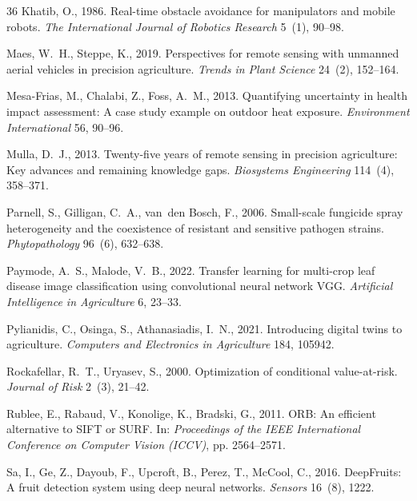 \documentclass[review,3p,times,authoryear]{elsarticle}
\begin{document}
\begin{thebibliography}{36}
Khatib, O., 1986.
\newblock Real-time obstacle avoidance for manipulators and mobile robots.
\newblock \emph{The International Journal of Robotics Research} 5~(1), 90--98.

Maes, W.~H., Steppe, K., 2019.
\newblock Perspectives for remote sensing with unmanned aerial vehicles in precision agriculture.
\newblock \emph{Trends in Plant Science} 24~(2), 152--164.

Mesa-Frias, M., Chalabi, Z., Foss, A.~M., 2013.
\newblock Quantifying uncertainty in health impact assessment: A case study example on outdoor heat exposure.
\newblock \emph{Environment International} 56, 90--96.

Mulla, D.~J., 2013.
\newblock Twenty-five years of remote sensing in precision agriculture: Key advances and remaining knowledge gaps.
\newblock \emph{Biosystems Engineering} 114~(4), 358--371.

Parnell, S., Gilligan, C.~A., van~den Bosch, F., 2006.
\newblock Small-scale fungicide spray heterogeneity and the coexistence of resistant and sensitive pathogen strains.
\newblock \emph{Phytopathology} 96~(6), 632--638.

Paymode, A.~S., Malode, V.~B., 2022.
\newblock Transfer learning for multi-crop leaf disease image classification using convolutional neural network VGG.
\newblock \emph{Artificial Intelligence in Agriculture} 6, 23--33.

Pylianidis, C., Osinga, S., Athanasiadis, I.~N., 2021.
\newblock Introducing digital twins to agriculture.
\newblock \emph{Computers and Electronics in Agriculture} 184, 105942.

Rockafellar, R.~T., Uryasev, S., 2000.
\newblock Optimization of conditional value-at-risk.
\newblock \emph{Journal of Risk} 2~(3), 21--42.

Rublee, E., Rabaud, V., Konolige, K., Bradski, G., 2011.
\newblock ORB: An efficient alternative to SIFT or SURF.
\newblock In: \emph{Proceedings of the IEEE International Conference on Computer Vision (ICCV)}, pp. 2564--2571.

Sa, I., Ge, Z., Dayoub, F., Upcroft, B., Perez, T., McCool, C., 2016.
\newblock DeepFruits: A fruit detection system using deep neural networks.
\newblock \emph{Sensors} 16~(8), 1222.


\end{thebibliography}
\end{document}

